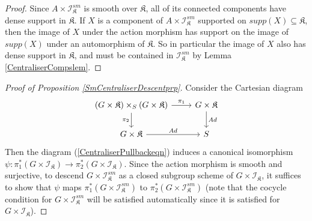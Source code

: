 \documentclass{amsart}
\theoremstyle{remark}
\numberwithin{theorem}{section}
\numberwithin{equation}{section}
\begin{document}
\begin{proof}
Since $A \times \mathcal I_{\mathfrak{K}}^{sm}$ is smooth over $\mathfrak{K}$, all of its connected components have dense support in $\mathfrak{K}$. If $X$ is a component of $A \times \mathcal I_{\mathfrak{K}}^{sm}$ supported on $supp(X) \subseteq \mathfrak{K}$, then the image of $X$ under the action morphism has support on the image of $supp(X)$ under an automorphism of $\mathfrak{K}$. So in particular the image of $X$ also has dense support in $\mathfrak{K}$, and must be contained in $\mathcal I_{\mathfrak{K}}^{sm}$ by Lemma \ref{CentraliserCompslem}.
\end{proof}

\begin{proof}[Proof of Proposition \ref{SmCentraliserDescentprp}] Consider the Cartesian diagram
\begin{equation}\label{SmCentraliserDescent1eqn}
\begin{tikzcd}
(G \times \mathfrak{K}) \times_S (G \times \mathfrak{K}) \arrow[r, "\pi_1"] \arrow[d, "\pi_2"'] & G \times \mathfrak{K} \arrow[d, "Ad"] \\
G \times \mathfrak{K} \arrow[r, "Ad"]                                                           & S                                    
\end{tikzcd}
\end{equation}
Then the diagram (\ref{CentraliserPullbackeqn}) induces a canonical isomorphism $\psi:\pi_1^*(G \times \mathcal I_{\mathfrak{K}}) \rightarrow \pi_2^*(G \times \mathcal I_{\mathfrak{K}})$. Since the action morphism is smooth and surjective, to descend $G \times \mathcal I_{\mathfrak{K}}^{sm}$ as a closed subgroup scheme of $G \times \mathcal I_{\mathfrak{K}}$, it suffices to show that $\psi$ maps $\pi_1^*(G \times \mathcal I_{\mathfrak{K}}^{sm})$ to $\pi_2^*(G \times \mathcal I_{\mathfrak{K}}^{sm})$ (note that the cocycle condition for $G \times \mathcal I_{\mathfrak{K}}^{sm}$ will be satisfied automatically since it is satisfied for $G \times \mathcal I_{\mathfrak{K}}$).


\end{proof}
\end{document}
